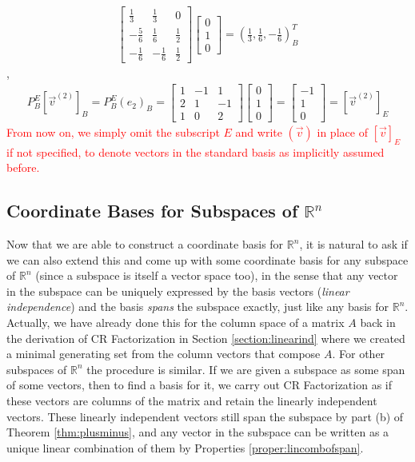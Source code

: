 \begin{solution}
{\begin{align*}
\begin{bmatrix}
\frac{1}{3} & \frac{1}{3} & 0\\ 
-\frac{5}{6} & \frac{1}{6} & \frac{1}{2}\\ 
-\frac{1}{6} & -\frac{1}{6} & \frac{1}{2}
\end{bmatrix}
\begin{bmatrix}
0 \\
1 \\
0
\end{bmatrix}
=
(\frac{1}{3}, \frac{1}{6}, -\frac{1}{6})_B^T
\end{align*}},
\begin{align*}
P_B^E [\vec{v}^{(2)}]_B =
P_B^E (e_2)_B =
\begin{bmatrix}
1 & -1 & 1 \\
2 & 1 & -1 \\
1 & 0 & 2
\end{bmatrix}
\begin{bmatrix}
0 \\
1 \\
0
\end{bmatrix}   
=
\begin{bmatrix}
-1 \\
1 \\
0
\end{bmatrix}
= [\vec{v}^{(2)}]_E
\end{align*}
\textcolor{red}{From now on, we simply omit the subscript $E$ and write $(\vec{v})$ in place of $[\vec{v}]_E$ if not specified, to denote vectors in the standard basis as implicitly assumed before.}
\end{solution}

\subsection{Coordinate Bases for Subspaces of $\mathbb{R}^n$}
\label{section:subspacebasis}

Now that we are able to construct a coordinate basis for $\mathbb{R}^n$, it is natural to ask if we can also extend this and come up with some coordinate basis for any subspace of $\mathbb{R}^n$ (since a subspace is itself a vector space too), in the sense that any vector in the subspace can be uniquely expressed by the basis vectors (\textit{linear independence}) and the basis \textit{spans} the subspace exactly, just like any basis for $\mathbb{R}^n$. Actually, we have already done this for the column space of a matrix $A$ back in the derivation of CR Factorization in Section \ref{section:linearind} where we created a minimal generating set from the column vectors that compose $A$. For other subspaces of $\mathbb{R}^n$ the procedure is similar. If we are given a subspace as some span of some vectors, then to find a basis for it, we carry out CR Factorization as if these vectors are columns of the matrix and retain the linearly independent vectors. These linearly independent vectors still span the subspace by part (b) of Theorem \ref{thm:plusminus}, and any vector in the subspace can be written as a unique linear combination of them by Properties \ref{proper:lincombofspan}. 

